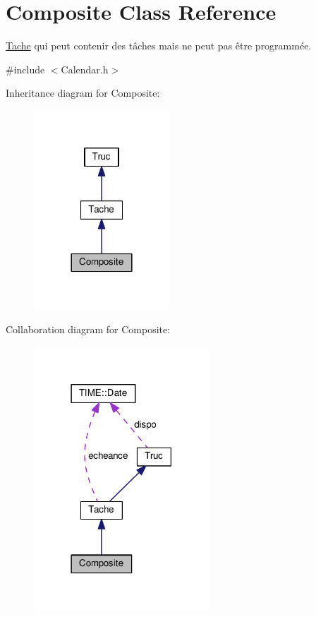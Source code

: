 \hypertarget{class_composite}{}\section{Composite Class Reference}
\label{class_composite}


\hyperlink{class_tache}{Tache} qui peut contenir des tâches mais ne peut pas être programmée.  




{\ttfamily \#include $<$Calendar.\+h$>$}



Inheritance diagram for Composite\+:\nopagebreak
\begin{figure}[H]
\begin{center}
\leavevmode
\includegraphics[width=144pt]{class_composite__inherit__graph}
\end{center}
\end{figure}


Collaboration diagram for Composite\+:\nopagebreak
\begin{figure}[H]
\begin{center}
\leavevmode
\includegraphics[width=186pt]{class_composite__coll__graph}
\end{center}
\end{figure}
